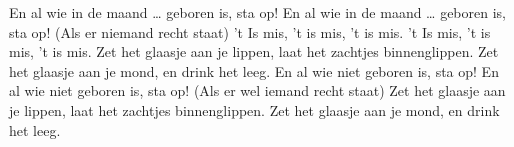 \beginverse*
En al wie in de maand … geboren is, sta op!
En al wie in de maand … geboren is, sta op!
\endverse
\beginchorus
 (Als er niemand recht staat)
't Is mis, 't is mis, 't is mis.
't Is mis, 't is mis, 't is mis.
\endchorus
\beginchorus
Zet het glaasje aan je lippen,
laat het zachtjes binnenglippen.
Zet het glaasje aan je mond,
en drink het leeg.
\endchorus
\beginverse*
En al wie niet geboren is, sta op!
En al wie niet geboren is, sta op!
\endverse
\beginverse*
(Als er wel iemand recht staat)
Zet het glaasje aan je lippen,
laat het zachtjes binnenglippen.
Zet het glaasje aan je mond,
en drink het leeg.
\endverse
\endsong